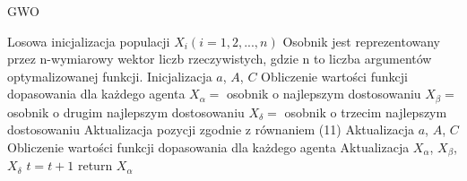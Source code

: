 \begin{algorithm}[H]
\caption{GWO}
\begin{algorithmic}
\STATE Losowa inicjalizacja populacji $X_i (i = 1, 2, ..., n)$ Osobnik jest reprezentowany przez n-wymiarowy wektor liczb rzeczywistych, gdzie n to liczba argumentów optymalizowanej funkcji.
\STATE Inicjalizacja $a$, $A$, $C$
\STATE Obliczenie wartości funkcji dopasowania dla każdego agenta 
\STATE $X_{\alpha} = $ osobnik o najlepszym dostosowaniu
\STATE $X_{\beta} = $ osobnik o drugim najlepszym dostosowaniu
\STATE $X_{\delta} = $ osobnik o trzecim najlepszym dostosowaniu
        \STATE Aktualizacja pozycji zgodnie z równaniem (11)
    \ENDFOR
    \STATE Aktualizacja $a$, $A$, $C$
    \STATE Obliczenie wartości funkcji dopasowania dla każdego agenta 
    \STATE Aktualizacja $X_\alpha$, $X_\beta$, $X_\delta$
    \STATE $t = t + 1$
\ENDWHILE
\STATE return $X_\alpha$
\end{algorithmic}
\end{algorithm}